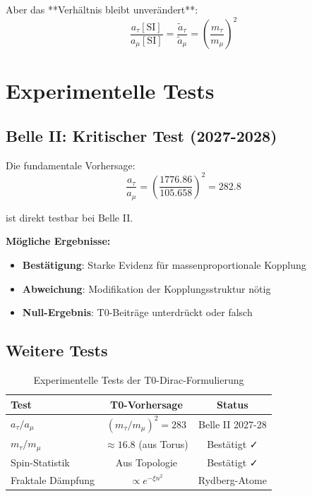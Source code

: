 	Aber das **Verhältnis bleibt unverändert**:
	\begin{equation}
		\frac{a_\tau[\text{SI}]}{a_\mu[\text{SI}]} = \frac{\tilde{a}_\tau}{\tilde{a}_\mu} = 
		\left(\frac{m_\tau}{m_\mu}\right)^2
	\end{equation}
	
	\section{Experimentelle Tests}
	
	\subsection{Belle II: Kritischer Test (2027-2028)}
	
	Die fundamentale Vorhersage:
	\begin{equation}
		\frac{a_\tau}{a_\mu} = \left(\frac{1776.86}{105.658}\right)^2 = 282.8
	\end{equation}
	
	ist direkt testbar bei Belle II.
	
	\textbf{Mögliche Ergebnisse:}
	\begin{itemize}
		\item \textbf{Bestätigung}: Starke Evidenz für massenproportionale Kopplung
		\item \textbf{Abweichung}: Modifikation der Kopplungsstruktur nötig
		\item \textbf{Null-Ergebnis}: T0-Beiträge unterdrückt oder falsch
	\end{itemize}
	
	\subsection{Weitere Tests}
	
	\begin{table}[h]
		\centering
		\begin{tabular}{lcc}
			\toprule
			\textbf{Test} & \textbf{T0-Vorhersage} & \textbf{Status} \\
			\midrule
			$a_\tau/a_\mu$ & $(m_\tau/m_\mu)^2 = 283$ & Belle II 2027-28 \\
			$m_\tau/m_\mu$ & $\approx 16.8$ (aus Torus) & Bestätigt ✓ \\
			Spin-Statistik & Aus Topologie & Bestätigt ✓ \\
			Fraktale Dämpfung & $\propto e^{-\xi n^2}$ & Rydberg-Atome \\
			\bottomrule
		\end{tabular}
		\caption{Experimentelle Tests der T0-Dirac-Formulierung}
	\end{table}
	
